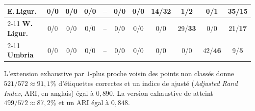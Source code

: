 \begin{table}[htbp]
\begin{tabular}{@{}l*{9}{c}c@{}}
\midrule
{\color[HTML]{32CB00}\textbf{E.\,Ligur.}}
  & {\color[HTML]{C0C0C0}0/0} & {\color[HTML]{C0C0C0}0/0} & {\color[HTML]{C0C0C0}0/0}
  & -- & {\color[HTML]{C0C0C0}0/0} & {\color[HTML]{C0C0C0}0/0} & 14/\textbf{32}
  & \textbf{1}/2 & \textbf{0}/1 & 35/\textbf{15} \\
\cmidrule(lr){2-11}
{\color[HTML]{34FF34}\textbf{W.\,Ligur.}}
  & {\color[HTML]{C0C0C0}0/0} & {\color[HTML]{C0C0C0}0/0} & {\color[HTML]{C0C0C0}0/0}
  & -- & {\color[HTML]{C0C0C0}0/0} & {\color[HTML]{C0C0C0}0/0} & {\color[HTML]{C0C0C0}0/0}
  & 29/\textbf{33} & {\color[HTML]{C0C0C0}0/0} & 21/\textbf{17} \\
\cmidrule(lr){2-11}
{\color[HTML]{036400}\textbf{Umbria}}
  & {\color[HTML]{C0C0C0}0/0} & {\color[HTML]{C0C0C0}0/0} & {\color[HTML]{C0C0C0}0/0}
  & -- & {\color[HTML]{C0C0C0}0/0} & {\color[HTML]{C0C0C0}0/0} & {\color[HTML]{C0C0C0}0/0}
  & {\color[HTML]{C0C0C0}0/0} & 42/\textbf{46} & 9/\textbf{5} \\
\bottomrule
\end{tabular}%
\end{table}

L'extension exhaustive par $1$-plus proche voisin des points non classés donne $521/572\approx91,1\%$ d'étiquettes correctes et un indice de  ajusté \cite{AdjustedRandIndex} (\emph{Adjusted Rand Index}, ARI, en anglais) égal à $0,890$. La version exhaustive de  atteint $499/572\approx87,2\%$ et un ARI égal à $0,848$.

